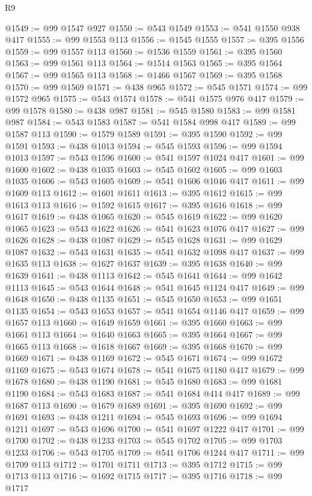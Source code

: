 \begin{lexlean}{R9}
\begin{coremodule}
@1549 := @99 @1547 @927
@1550 := @543 @1549
@1553 := @541 @1550 @938 @417
@1555 := @99 @1553 @113
@1556 := @1545 @1555
@1557 := @395 @1556
@1559 := @99 @1557 @113
@1560 := @1536 @1559
@1561 := @395 @1560
@1563 := @99 @1561 @113
@1564 := @1514 @1563
@1565 := @395 @1564
@1567 := @99 @1565 @113
@1568 := @1466 @1567
@1569 := @395 @1568
@1570 := @99 @1569
@1571 := @438 @965
@1572 := @545 @1571
@1574 := @99 @1572 @965
@1575 := @543 @1574
@1578 := @541 @1575 @976 @417
@1579 := @99 @1578
@1580 := @438 @987
@1581 := @545 @1580
@1583 := @99 @1581 @987
@1584 := @543 @1583
@1587 := @541 @1584 @998 @417
@1589 := @99 @1587 @113
@1590 := @1579 @1589
@1591 := @395 @1590
@1592 := @99 @1591
@1593 := @438 @1013
@1594 := @545 @1593
@1596 := @99 @1594 @1013
@1597 := @543 @1596
@1600 := @541 @1597 @1024 @417
@1601 := @99 @1600
@1602 := @438 @1035
@1603 := @545 @1602
@1605 := @99 @1603 @1035
@1606 := @543 @1605
@1609 := @541 @1606 @1046 @417
@1611 := @99 @1609 @113
@1612 := @1601 @1611
@1613 := @395 @1612
@1615 := @99 @1613 @113
@1616 := @1592 @1615
@1617 := @395 @1616
@1618 := @99 @1617
@1619 := @438 @1065
@1620 := @545 @1619
@1622 := @99 @1620 @1065
@1623 := @543 @1622
@1626 := @541 @1623 @1076 @417
@1627 := @99 @1626
@1628 := @438 @1087
@1629 := @545 @1628
@1631 := @99 @1629 @1087
@1632 := @543 @1631
@1635 := @541 @1632 @1098 @417
@1637 := @99 @1635 @113
@1638 := @1627 @1637
@1639 := @395 @1638
@1640 := @99 @1639
@1641 := @438 @1113
@1642 := @545 @1641
@1644 := @99 @1642 @1113
@1645 := @543 @1644
@1648 := @541 @1645 @1124 @417
@1649 := @99 @1648
@1650 := @438 @1135
@1651 := @545 @1650
@1653 := @99 @1651 @1135
@1654 := @543 @1653
@1657 := @541 @1654 @1146 @417
@1659 := @99 @1657 @113
@1660 := @1649 @1659
@1661 := @395 @1660
@1663 := @99 @1661 @113
@1664 := @1640 @1663
@1665 := @395 @1664
@1667 := @99 @1665 @113
@1668 := @1618 @1667
@1669 := @395 @1668
@1670 := @99 @1669
@1671 := @438 @1169
@1672 := @545 @1671
@1674 := @99 @1672 @1169
@1675 := @543 @1674
@1678 := @541 @1675 @1180 @417
@1679 := @99 @1678
@1680 := @438 @1190
@1681 := @545 @1680
@1683 := @99 @1681 @1190
@1684 := @543 @1683
@1687 := @541 @1684 @414 @417
@1689 := @99 @1687 @113
@1690 := @1679 @1689
@1691 := @395 @1690
@1692 := @99 @1691
@1693 := @438 @1211
@1694 := @545 @1693
@1696 := @99 @1694 @1211
@1697 := @543 @1696
@1700 := @541 @1697 @1222 @417
@1701 := @99 @1700
@1702 := @438 @1233
@1703 := @545 @1702
@1705 := @99 @1703 @1233
@1706 := @543 @1705
@1709 := @541 @1706 @1244 @417
@1711 := @99 @1709 @113
@1712 := @1701 @1711
@1713 := @395 @1712
@1715 := @99 @1713 @113
@1716 := @1692 @1715
@1717 := @395 @1716
@1718 := @99 @1717

\end{coremodule}
\end{lexlean}
